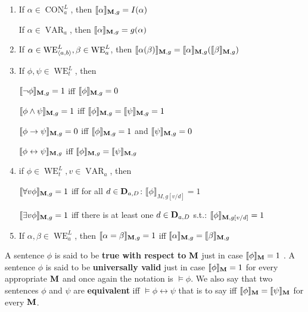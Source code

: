 \documentclass[11pt]{article}
\DeclareMathOperator{\VAR}{VAR}
\DeclareMathOperator{\CON}{CON}
\DeclareMathOperator{\WE}{WE}
\begin{document}
\begin{definition}[]
\label{def4.2.3}
\begin{enumerate}
\item If \(\alpha\in \CON_a^L\), then
\(\llbracket\alpha\rrbracket_{\operatorname{\textbf{M}},g}=I(\alpha)\)

If \(\alpha\in \VAR_a\), then \(\llbracket\alpha\rrbracket_{\operatorname{\textbf{M}},g}=g(\alpha)\)

\item If \(\alpha\in \WE^L_{\la a,b\ra},\beta\in \WE^L_a\), then
\(\llbracket\alpha(\beta)\rrbracket_{\operatorname{\textbf{M}},g}=\llbracket\alpha\rrbracket_{\operatorname{\textbf{M}},g}(
       \llbracket\beta\rrbracket_{\operatorname{\textbf{M}},g})\)

\item If \(\phi,\psi\in \WE_t^L\), then

\(\llbracket\neg\phi\rrbracket_{\operatorname{\textbf{M}},g}=1\) iff
\(\llbracket\phi\rrbracket_{\operatorname{\textbf{M}},g}=0\)

\(\llbracket\phi\wedge\psi\rrbracket_{\operatorname{\textbf{M}},g}=1\) iff
\(\llbracket\phi\rrbracket_{\operatorname{\textbf{M}},g}=\llbracket\psi\rrbracket_{\operatorname{\textbf{M}},g}=1\)

\(\llbracket\phi\to\psi\rrbracket_{\operatorname{\textbf{M}},g}=0\) iff
\(\llbracket\phi\rrbracket_{\operatorname{\textbf{M}},g}=1\) and
\(\llbracket\psi\rrbracket_{\operatorname{\textbf{M}},g}=0\)

\(\llbracket\phi\leftrightarrow\psi\rrbracket_{\operatorname{\textbf{M}},g}\) iff
\(\llbracket\phi\rrbracket_{\operatorname{\textbf{M}},g}=\llbracket\psi\rrbracket_{\operatorname{\textbf{M}},g}\)

\item if \(\phi\in \WE_t^L,v\in \VAR_a\), then

\(\llbracket\forall v\phi\rrbracket_{\operatorname{\textbf{M}},g}=1\) iff for all
\(d\in\operatorname{\textbf{D}}_{a,D}\):
\(\llbracket\phi\rrbracket_{M,g[v/d]}=1\)

\(\llbracket\exists v\phi\rrbracket_{\operatorname{\textbf{M}},g}=1\) iff there is at least one
\(d\in\operatorname{\textbf{D}}_{a,D}\) s.t.: \(\llbracket\phi\rrbracket_{\operatorname{\textbf{M}},g[v/d]}=1\)

\item If \(\alpha,\beta\in \WE_a^L\), then
\(\llbracket\alpha=\beta\rrbracket_{\operatorname{\textbf{M}},g}=1\) iff
\(\llbracket\alpha\rrbracket_{\operatorname{\textbf{M}},g}=\llbracket\beta\rrbracket_{\operatorname{\textbf{M}},g}\)
\end{enumerate}
\end{definition}

A sentence \(\phi\) is said to be \textbf{true with respect to} \(\operatorname{\textbf{M}}\) just in case
\(\llbracket\phi\rrbracket_{\operatorname{\textbf{M}}}=1\) . A sentence \(\phi\) is said to be
\textbf{universally valid} just in case \(\llbracket\phi\rrbracket_{\operatorname{\textbf{M}}}=1\) for
every appropriate \(\operatorname{\textbf{M}}\) and once again the notation is \(\models\phi\). We
also say that two sentences \(\phi\) and \(\psi\) are \textbf{equivalent} iff
\(\models\phi\leftrightarrow\psi\) that is to say iff
\(\llbracket\phi\rrbracket_{\operatorname{\textbf{M}}}=\llbracket\psi\rrbracket_{\operatorname{\textbf{M}}}\) for every \(\operatorname{\textbf{M}}\).
\end{document}
